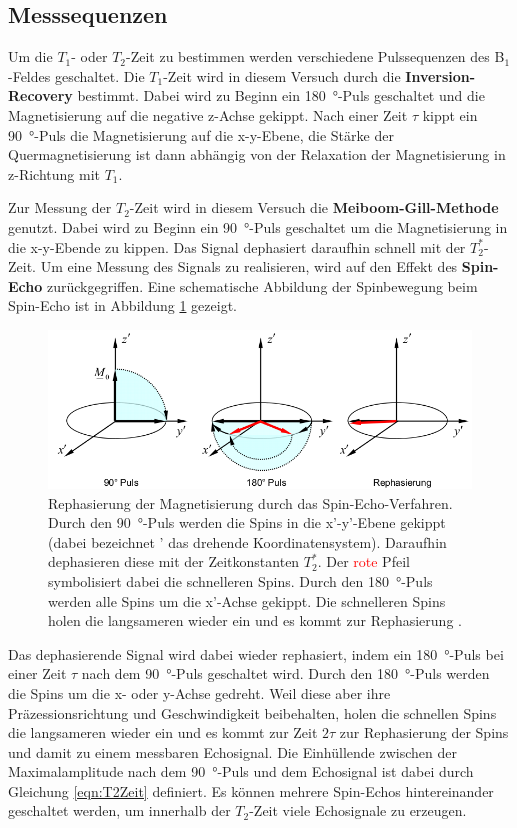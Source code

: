 
\subsection{Messsequenzen}

Um die $T_1$- oder $T_2$-Zeit zu bestimmen werden verschiedene Pulssequenzen des B$_1$-Feldes geschaltet.
Die $T_1$-Zeit wird in diesem Versuch durch die \textbf{Inversion-Recovery} bestimmt.
Dabei wird zu Beginn ein \SI{180}{\degree}-Puls geschaltet und die Magnetisierung auf die negative z-Achse gekippt.
Nach einer Zeit $\tau$ kippt ein \SI{90}{\degree}-Puls die Magnetisierung auf die x-y-Ebene, die Stärke der Quermagnetisierung ist dann abhängig von der Relaxation der Magnetisierung in z-Richtung mit $T_1$.

Zur Messung der $T_2$-Zeit wird in diesem Versuch die \textbf{Meiboom-Gill-Methode} genutzt.
Dabei wird zu Beginn ein \SI{90}{\degree}-Puls geschaltet um die Magnetisierung in die x-y-Ebende zu kippen.
Das Signal dephasiert daraufhin schnell mit der $T_2^*$-Zeit.
Um eine Messung des Signals zu realisieren, wird auf den Effekt des \textbf{Spin-Echo} zurückgegriffen.
Eine schematische Abbildung der Spinbewegung beim Spin-Echo ist in Abbildung \ref{fig:Spin-Echo} gezeigt.

\begin{figure}[H]
  \centering
  \includegraphics[width = .6\textwidth]{Spin-Echo.png}
  \caption{Rephasierung der Magnetisierung durch das Spin-Echo-Verfahren. Durch den \SI{90}{\degree}-Puls werden die Spins in die x'-y'-Ebene gekippt (dabei bezeichnet ' das drehende Koordinatensystem). Daraufhin dephasieren diese mit der Zeitkonstanten $T_2^*$. Der \textcolor{red}{rote} Pfeil symbolisiert dabei die schnelleren Spins. Durch den \SI{180}{\degree}-Puls werden alle Spins um die x'-Achse gekippt. Die schnelleren Spins holen die langsameren wieder ein und es kommt zur Rephasierung \cite{TOMO}.}
  \label{fig:Spin-Echo}
\end{figure}

Das dephasierende Signal wird dabei wieder rephasiert, indem ein \SI{180}{\degree}-Puls bei einer Zeit $\tau$ nach dem \SI{90}{\degree}-Puls geschaltet wird.
Durch den \SI{180}{\degree}-Puls werden die Spins um die x- oder y-Achse gedreht.
Weil diese aber ihre Präzessionsrichtung und Geschwindigkeit beibehalten, holen die schnellen Spins die langsameren wieder ein und es kommt zur Zeit $2\tau$ zur Rephasierung der Spins und damit zu einem messbaren Echosignal.
Die Einhüllende zwischen der Maximalamplitude nach dem \SI{90}{\degree}-Puls und dem Echosignal ist dabei durch Gleichung \eqref{eqn:T2Zeit} definiert.
Es können mehrere Spin-Echos hintereinander geschaltet werden, um innerhalb der $T_2$-Zeit viele Echosignale zu erzeugen.

